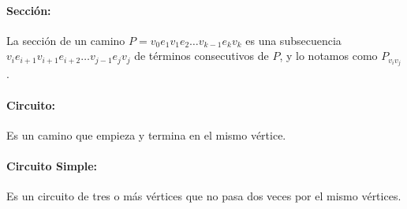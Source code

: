 \paragraph{Sección:} La sección de un camino \(P = v_0e_1v_1e_2\dots v_{k-1}e_kv_k\) es una subsecuencia \(v_ie_{i+1}v_{i+1}e_{i+2}\dots v_{j-1}e_jv_j\) de términos consecutivos de \(P\), y lo notamos como \(P_{v_iv_j}\).

\paragraph{Circuito:} Es un camino que empieza y termina en el mismo vértice.

\paragraph{Circuito Simple:} Es un circuito de tres o más vértices que no pasa dos veces por el mismo vértices.

